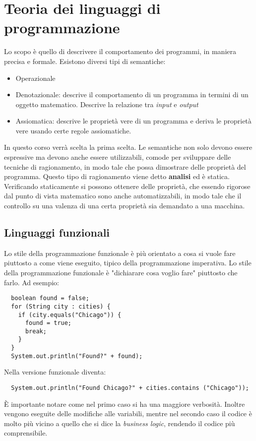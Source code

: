 \chapter{Teoria dei linguaggi di programmazione}

Lo scopo è quello di descrivere il comportamento dei programmi, in maniera
precisa e formale. Esistono diversi tipi di semantiche:
\begin{itemize}
  \item Operazionale
  \item Denotazionale: descrive il comportamento di un programma in termini di
un oggetto matematico. Descrive la relazione tra \textit{input} e
\textit{output}
  \item Assiomatica: descrive le proprietà vere di un programma e deriva le
proprietà vere usando certe regole assiomatiche.
\end{itemize}

In questo corso verrà scelta la prima scelta.
Le semantiche non solo devono essere espressive ma devono anche essere
utilizzabili, comode per sviluppare delle tecniche di ragionamento, in modo
tale che possa dimostrare delle proprietà del programma. Questo tipo di
ragionamento viene detto \textbf{analisi} ed è statica. Verificando
staticamente si possono ottenere delle proprietà, che essendo rigorose dal
punto di vista matematico sono anche automatizzabili, in modo tale che il
controllo su una valenza di una certa proprietà sia demandato a una macchina.

\section{Linguaggi funzionali}
Lo stile della programmazione funzionale è più orientato a cosa si vuole fare
piuttosto a come viene eseguito, tipico della programmazione imperativa. Lo
stile della programmazione funzionale è "dichiarare cosa voglio fare" piuttosto
che farlo.
Ad esempio:
\begin{verbatim}
  boolean found = false;
  for (String city : cities) {
    if (city.equals("Chicago")) {
      found = true;
      break;
    }
  }
  System.out.println("Found?" + found);
\end{verbatim}
Nella versione funzionale diventa:
\begin{verbatim}
  System.out.println("Found Chicago?" + cities.contains ("Chicago"));
\end{verbatim}

È importante notare come nel primo caso si ha una maggiore verbosità. Inoltre
vengono eseguite delle modifiche alle variabili, mentre nel secondo caso il
codice è molto più vicino a quello che si dice la \textit{business logic},
rendendo il codice più comprensibile.


